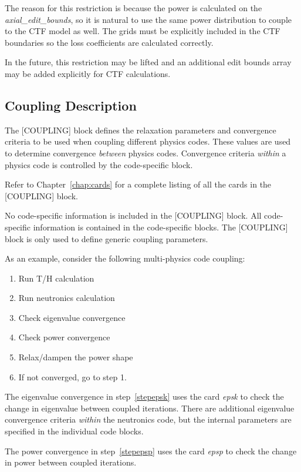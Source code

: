 The reason for this restriction is because the power is calculated on the {\it axial\_edit\_bounds},
so it is natural to use the same power distribution to couple to the CTF model as well.
The grids must be explicitly included in the CTF boundaries so the loss coefficients are calculated correctly.

In the future, this restriction may be lifted and an additional edit bounds array may
be added explicitly for CTF calculations.


\subsection{Coupling Description}

The [COUPLING] block defines the relaxation parameters and convergence criteria to be
used when coupling different physics codes.  These values are used to determine
convergence {\it between} physics codes.  Convergence criteria {\it within} a physics
code is controlled by the code-specific block.

Refer to Chapter~\ref{chap:cards} for a complete listing of all the cards in the [COUPLING] block.

No code-specific information is included in the [COUPLING] block.  All code-specific information
is contained in the code-specific blocks.  The [COUPLING] block is only used to define
generic coupling parameters.

As an example, consider the following multi-physics code coupling:
\begin{enumerate}
  \item  Run T/H calculation
  \item  Run neutronics calculation
  \item  Check eigenvalue convergence \label{stepepsk}
  \item  Check power convergence \label{stepepsp}
  \item  Relax/dampen the power shape
  \item  If not converged, go to step 1.
\end{enumerate}
The eigenvalue convergence in step~\ref{stepepsk} uses the card {\it epsk} to check
the change in eigenvalue between coupled iterations.
There are additional eigenvalue convergence criteria {\it within} the neutronics
code, but the internal parameters are specified in the individual code blocks.

The power convergence in step~\ref{stepepsp} uses the card {\it epsp} to check
the change in power between coupled iterations.

